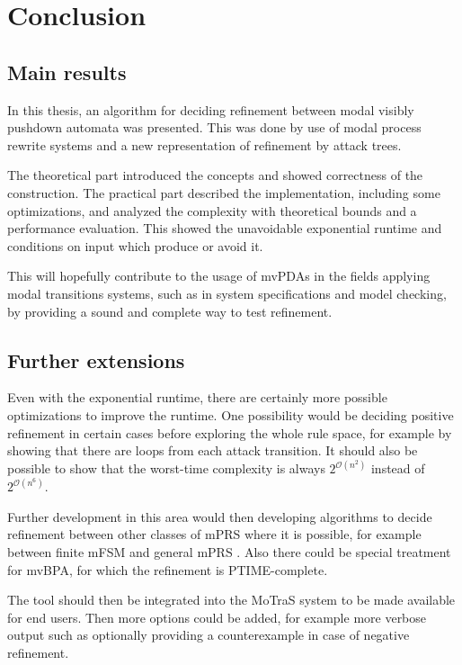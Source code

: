 \chapter{Conclusion}

\section{Main results}

In this thesis, an algorithm for deciding refinement
between modal visibly pushdown automata was presented.
This was done by use of modal process rewrite systems
and a new representation of refinement by attack trees.

The theoretical part introduced the concepts and showed
correctness of the construction.
The practical part described the implementation,
including some optimizations, and analyzed the
complexity with theoretical bounds and a performance evaluation.
This showed the unavoidable exponential runtime and
conditions on input which produce or avoid it.

This will hopefully contribute to the usage of mvPDAs
in the fields applying modal transitions systems, such as in
system specifications and model checking, by providing
a sound and complete way to test refinement.

\section{Further extensions}

Even with the exponential runtime, there are certainly
more possible optimizations to improve the runtime.
One possibility would be deciding positive refinement in certain cases before
exploring the whole rule space, for example by showing that there are
loops from each attack transition.
It should also be possible to show that the worst-time complexity
is always $2^{\mathcal O(n^2)}$ instead of $2^{\mathcal O(n^6)}$.

Further development in this area would then developing algorithms to
decide refinement between other classes of mPRS where it is possible, for example
between finite mFSM and general mPRS \cite{BenesK12}. Also there could be
special treatment for mvBPA, for which the refinement is PTIME-complete.

The tool should then be integrated into the MoTraS system to be made
available for end users. Then more options could be added, for example
more verbose output such as optionally providing a counterexample
in case of negative refinement.

